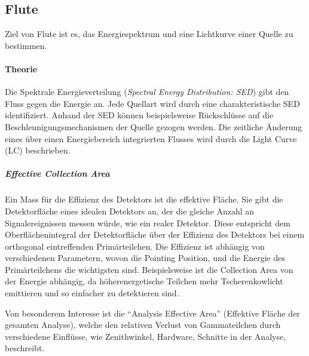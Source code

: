 \subsection{Flute}%
\label{sub:flute}

Ziel von Flute ist es,
das Energiespektrum und
eine Lichtkurve einer Quelle zu bestimmen.

\paragraph{Theorie}%

Die
Spektrale Energieverteilung (\textit{Spectral Energy Distribution: SED})
gibt den Fluss gegen die Energie an.
Jede Quellart wird durch eine charakteristische SED identifiziert.
Anhand der SED können beispielsweise Rückschlüsse auf die
Beschleunigungsmechanismen der Quelle gezogen werden.
Die zeitliche Änderung eines über einen Energiebereich integrierten Flusses wird durch die Light Curve (LC) beschrieben.

\subparagraph{Effective Collection Area}
Ein Mass für die Effizienz des Detektors ist die effektive Fläche.
Sie gibt die Detektorfläche eines idealen Detektors an,
der die gleiche Anzahl an Signalereignissen messen würde,
wie ein realer Detektor.
Diese entspricht dem Oberflächenintegral der Detektorfläche
über der Effizienz des Detektors
bei einem orthogonal eintreffenden Primärteilchen.
Die Effizienz ist abhängig von verschiedenen Parametern,
wovon die Pointing Position,
und die Energie des Primärteilchens
die wichtigsten sind.
Beispielsweise ist die Collection Area von der Energie abhängig,
da höherenergetische Teilchen mehr Tscherenkowlicht emittieren
und so einfacher zu detektieren sind.

Von besonderem Interesse ist die \enquote{Analysis Effective Area}
(Effektive Fläche der gesamten Analyse),
welche den relativen Verlust von Gammateilchen durch verschiedene
Einflüsse, wie Zenithwinkel, Hardware, Schnitte in der Analyse,
beschreibt.

